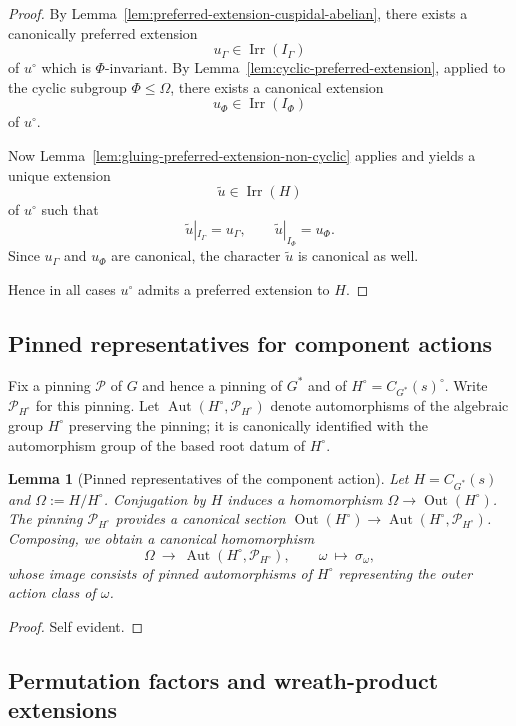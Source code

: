 \documentclass{amsart}
\theoremstyle{plain}
\numberwithin{equation}{section}
\newtheorem{lemma}[theorem]{Lemma}
\theoremstyle{definition}
\newcommand{\cP}{\mathcal{P}}
\newcommand{\Out}{\operatorname{Out}}
\newcommand{\Irr}{\operatorname{Irr}}
\newcommand{\Aut}{\operatorname{Aut}}
\begin{document}
\begin{proof}
By Lemma~\ref{lem:preferred-extension-cuspidal-abelian}, there exists a canonically preferred
extension
\[
u_\Gamma\in\Irr(I_\Gamma)
\]
of \(u^\circ\) which is \(\Phi\)-invariant. By
Lemma~\ref{lem:cyclic-preferred-extension}, applied to the cyclic subgroup
\(\Phi\le \Omega\), there exists a canonical extension
\[
u_\Phi\in\Irr(I_\Phi)
\]
of \(u^\circ\).

Now Lemma~\ref{lem:gluing-preferred-extension-non-cyclic} applies and yields a unique extension
\[
\widetilde u\in\Irr(H)
\]
of \(u^\circ\) such that
\[
\widetilde u|_{I_\Gamma}=u_\Gamma,
\qquad
\widetilde u|_{I_\Phi}=u_\Phi.
\]
Since \(u_\Gamma\) and \(u_\Phi\) are canonical, the character \(\widetilde u\) is canonical as
well.

Hence in all cases \(u^\circ\) admits a preferred extension to \(H\).
\end{proof}


\subsection{Pinned representatives for component actions}
Fix a pinning $\cP$ of $G$ and hence a pinning of $G^*$ and of $H^\circ=C_{G^*}(s)^\circ$.
Write $\cP_{H^\circ}$ for this pinning.  Let $\Aut(H^\circ,\cP_{H^\circ})$ denote automorphisms of
the algebraic group $H^\circ$ preserving the pinning; it is canonically identified with the
automorphism group of the based root datum of $H^\circ$.

\begin{lemma}[Pinned representatives of the component action]\label{lem:pinned-reps-Omega}
Let $H=C_{G^*}(s)$ and $\Omega:=H/H^\circ$.  Conjugation by $H$ induces a homomorphism
$\Omega\to\Out(H^\circ)$.  The pinning $\cP_{H^\circ}$ provides a canonical section
$\Out(H^\circ)\to \Aut(H^\circ,\cP_{H^\circ})$.  Composing, we obtain a canonical homomorphism
\[
\Omega\ \longrightarrow\ \Aut(H^\circ,\cP_{H^\circ}),\qquad \omega\ \longmapsto\ \sigma_\omega,
\]
whose image consists of pinned automorphisms of $H^\circ$ representing the outer action class of $\omega$.
\end{lemma}

\begin{proof}
Self evident.
\end{proof}

\subsection{Permutation factors and wreath-product extensions}
\end{document}
